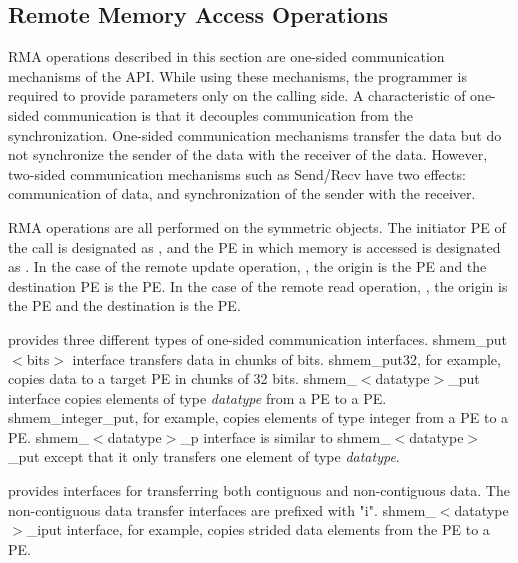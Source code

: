 \subsection{Remote Memory Access Operations}
\label{sec:rma}
\ac{RMA} operations described in this section are one-sided communication
mechanisms of the \openshmem{} \ac{API}. While 
using these mechanisms, the programmer is required to provide parameters
only on the calling side. A characteristic of one-sided communication 
is that it decouples communication from
the synchronization. One-sided communication mechanisms transfer 
the data but do not synchronize the sender of the data with the receiver
of the data. However, two-sided communication mechanisms such as Send/Recv have two effects: 
communication of data, and synchronization of the sender with the receiver.

\openshmem{} \ac{RMA} operations are all performed on the symmetric objects. 
The initiator \ac{PE} of the call is designated as \source{}, and the 
\ac{PE} in which memory is accessed is designated as \target{}. In the case of the remote
update operation, \PUT{}, the origin is the \source{} \ac{PE} and the 
destination \ac{PE} is the \target{} PE. In the case of the remote read operation, \GET{}, 
the origin is the \target{} \ac{PE} and the destination is the \source{} \ac{PE}.

\openshmem{} provides three different types of one-sided communication interfaces. 
shmem\_put$<$bits$>$ interface transfers data in chunks 
of bits. shmem\_put32, for example, copies data to a target \ac{PE} in chunks of 
32 bits. shmem\_$<$datatype$>$\_put interface copies elements of type 
\textit{datatype} from a \source{} \ac{PE} to a \target{} \ac{PE}. 
shmem\_integer\_put, for example, copies elements
of type integer from a \source{} \ac{PE} to a \target{} \ac{PE}. 
shmem\_$<$datatype$>$\_p interface is similar to shmem\_$<$datatype$>$\_put 
except that it only transfers one element of type \textit{datatype}.

\openshmem{} provides interfaces for transferring both contiguous and 
non-contiguous data. The non-contiguous data transfer interfaces are prefixed 
with "i". shmem\_$<$datatype$>$\_iput interface, for example, copies strided
data elements from the \source{} \ac{PE} to a \target{} \ac{PE}. 


